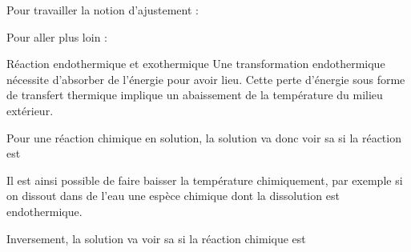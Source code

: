 \begin{minipage}[t]{0.48\linewidth}\vspace{0pt}
  \numeroQuestion
  Pour travailler la notion d'ajustement :

  \begin{center}  
  \end{center}
\end{minipage}
\begin{minipage}[t]{0.48\linewidth}\vspace{0pt}
  \numeroQuestion
  Pour aller plus loin :

  \begin{center}  
  \end{center}
\end{minipage}


\begin{doc}{Réaction endothermique et exothermique}
  Une transformation endothermique nécessite d'absorber de l'énergie pour avoir lieu.
  Cette perte d'énergie sous forme de transfert thermique implique un abaissement de la température du milieu extérieur.
  
  \begin{importants}
    Pour une réaction chimique en solution, la solution va donc voir sa  si la réaction est 
  \end{importants}
  
  Il est ainsi possible de faire baisser la température chimiquement, par exemple si on dissout dans de l'eau une espèce chimique dont la dissolution est endothermique.
  
  \begin{importants}
    Inversement, la solution va voir sa  si la réaction chimique est 
  \end{importants}
\end{doc}

